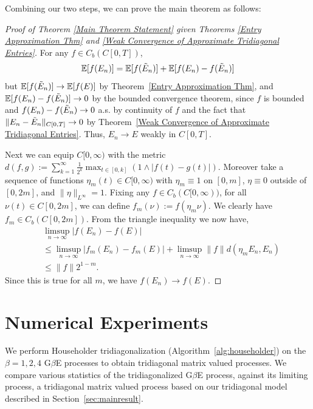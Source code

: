 \documentclass{amsart}
\numberwithin{equation}{section}
\newcommand{\E}{\mathbb{E}}
\begin{document}
Combining our two steps, we can prove the main theorem as follows:

\begin{proof}[Proof of Theorem \ref{Main Theorem Statement} given Theorems \ref{Entry Approximation Thm} and \ref{Weak Convergence of Approximate Tridiagonal Entries}]


For any $f \in C_b(C[0,T])$,
\begin{equation}
    \E[f(E_n)] = \E[f(\Tilde{E}_n)]+\E[f(E_n)-f(\Tilde{E}_n)]
\end{equation}
but $\E[f(\Tilde{E}_n)] \to \E[f(E)]$ by Theorem~\ref{Entry Approximation Thm}, and $\E[f(E_n)-f(\Tilde{E}_n)] \to 0$ by the bounded convergence theorem, since $f$ is bounded and $f(E_n)-f(\Tilde{E}_n) \to 0$ a.s. by continuity of $f$ and the fact that $\|E_n-\Tilde{E}_n\|_{C[0,T]} \to 0$ by Theorem~\ref{Weak Convergence of Approximate Tridiagonal Entries}. Thus, $E_n \to E$ weakly in $C[0,T]$.

Next we can equip $C[0,\infty)$ with the metric $d(f,g):= \sum_{k=1}^{\infty} \frac{1}{2^k} \max_{t \in [0,k]} (1 \wedge |f(t)-g(t)|)$. Moreover take a sequence of functions $\eta_m(t) \in C[0,\infty)$ with $\eta_m \equiv 1$ on $[0,m]$, $\eta \equiv 0$ outside of $[0,2m]$, and $\|\eta\|_{L^{\infty}} =1$. Fixing any $f \in C_b(C[0,\infty))$, for all $\nu(t) \in C[0,2m]$, we can define $f_m(\nu):= f(\eta_m \nu)$. We clearly have $f_m \in C_b(C[0,2m])$. From the triangle inequality we now have,
\begin{equation*}
    \begin{split}
        &\limsup_{n\to \infty}|f(E_n)-f(E)|\\
        &\leq \limsup_{n\to \infty}|f_m(E_n)-f_m(E)|+\limsup_{n\to \infty} \|f\|d(\eta_m E_n,E_n)\\
        & \leq \|f\|2^{1-m}.
    \end{split}
\end{equation*}
Since this is true for all $m$, we have $f(E_n) \to f(E)$.
\end{proof}



\section{Numerical Experiments}\label{Numerics}

We perform Householder tridiagonalization (Algorithm~\ref{alg:householder}) on the $\beta=1,2,4$ G$\beta$E processes to obtain tridiagonal matrix valued processes. We compare various statistics of the tridiagonalized G$\beta$E process, against its limiting process, a tridiagonal matrix valued process based on our tridiagonal model described in Section~\ref{sec:mainresult}. 
\end{document}
